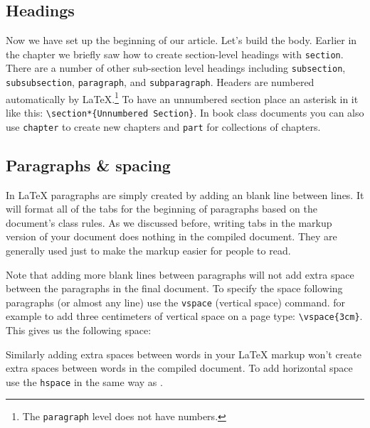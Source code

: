 \subsection{Headings}

Now we have set up the beginning of our article. Let's build the body. 
Earlier in the chapter we briefly saw how to create section-level headings with \texttt{section}. There are a number of other sub-section level headings including \texttt{subsection}, \texttt{subsubsection}, \texttt{paragraph}, and \texttt{subparagraph}. Headers are numbered automatically by LaTeX.\footnote{The \texttt{paragraph} level does not have numbers.} To have an unnumbered section place an asterisk in it like this: \verb|\section*{Unnumbered Section}|. In book class documents you can also use \texttt{chapter} to create new chapters and \texttt{part} for collections of chapters.

\subsection{Paragraphs \& spacing}

In LaTeX paragraphs are simply created by adding an blank line between lines. It will format all of the tabs for the beginning of paragraphs based on the document's class rules. As we discussed before, writing tabs in the markup version of your document does nothing in the compiled document. They are generally used just to make the markup easier for people to read. 

Note that adding more blank lines between paragraphs will not add extra space between the paragraphs in the final document. To specify the space following paragraphs (or almost any line) use the \texttt{vspace} (vertical space) command. for example to add three centimeters of vertical space on a page type: \verb|\vspace{3cm}|. This gives us the following space:

\vspace{3cm}

Similarly adding extra spaces between words in your LaTeX markup won't create extra spaces between words in the compiled document. To add horizontal space use the \texttt{hspace} in the same way as .

